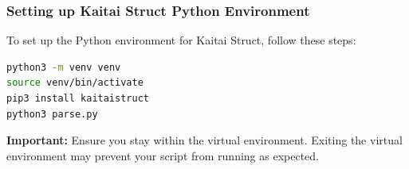 \begin{frame}[fragile]
    \frametitle{Setting up Kaitai Struct Python Environment}

    To set up the Python environment for Kaitai Struct, follow these steps:



    \begin{lstlisting}[language=bash,frame=single]
python3 -m venv venv
source venv/bin/activate
pip3 install kaitaistruct
python3 parse.py
    \end{lstlisting}

    \textbf{Important:} Ensure you stay within the virtual environment. Exiting the virtual environment may prevent your script from running as expected.
\end{frame}




